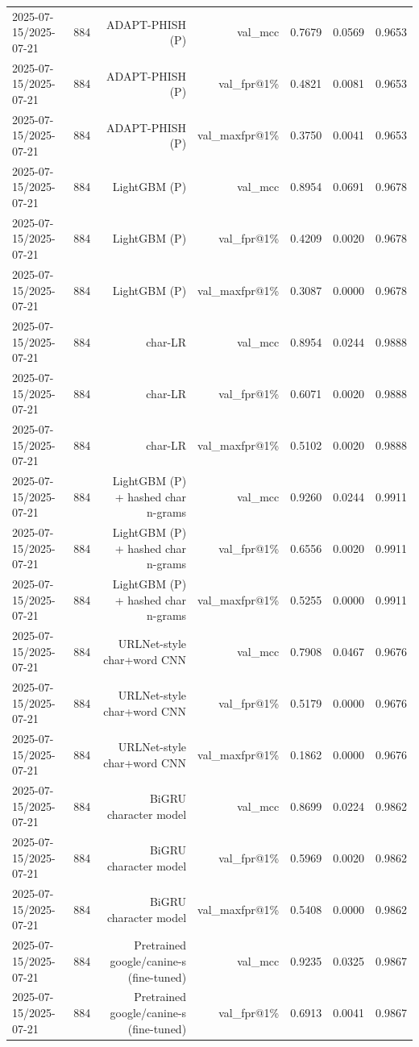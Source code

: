 \begin{table}[t]
\begin{tabular}{llrrrrr}
2025-07-15/2025-07-21 & 884 & ADAPT-PHISH (P) & val\_mcc & 0.7679 & 0.0569 & 0.9653 \\
2025-07-15/2025-07-21 & 884 & ADAPT-PHISH (P) & val\_fpr@1\% & 0.4821 & 0.0081 & 0.9653 \\
2025-07-15/2025-07-21 & 884 & ADAPT-PHISH (P) & val\_maxfpr@1\% & 0.3750 & 0.0041 & 0.9653 \\
2025-07-15/2025-07-21 & 884 & LightGBM (P) & val\_mcc & 0.8954 & 0.0691 & 0.9678 \\
2025-07-15/2025-07-21 & 884 & LightGBM (P) & val\_fpr@1\% & 0.4209 & 0.0020 & 0.9678 \\
2025-07-15/2025-07-21 & 884 & LightGBM (P) & val\_maxfpr@1\% & 0.3087 & 0.0000 & 0.9678 \\
2025-07-15/2025-07-21 & 884 & char-LR & val\_mcc & 0.8954 & 0.0244 & 0.9888 \\
2025-07-15/2025-07-21 & 884 & char-LR & val\_fpr@1\% & 0.6071 & 0.0020 & 0.9888 \\
2025-07-15/2025-07-21 & 884 & char-LR & val\_maxfpr@1\% & 0.5102 & 0.0020 & 0.9888 \\
2025-07-15/2025-07-21 & 884 & LightGBM (P) + hashed char n-grams & val\_mcc & 0.9260 & 0.0244 & 0.9911 \\
2025-07-15/2025-07-21 & 884 & LightGBM (P) + hashed char n-grams & val\_fpr@1\% & 0.6556 & 0.0020 & 0.9911 \\
2025-07-15/2025-07-21 & 884 & LightGBM (P) + hashed char n-grams & val\_maxfpr@1\% & 0.5255 & 0.0000 & 0.9911 \\
2025-07-15/2025-07-21 & 884 & URLNet-style char+word CNN & val\_mcc & 0.7908 & 0.0467 & 0.9676 \\
2025-07-15/2025-07-21 & 884 & URLNet-style char+word CNN & val\_fpr@1\% & 0.5179 & 0.0000 & 0.9676 \\
2025-07-15/2025-07-21 & 884 & URLNet-style char+word CNN & val\_maxfpr@1\% & 0.1862 & 0.0000 & 0.9676 \\
2025-07-15/2025-07-21 & 884 & BiGRU character model & val\_mcc & 0.8699 & 0.0224 & 0.9862 \\
2025-07-15/2025-07-21 & 884 & BiGRU character model & val\_fpr@1\% & 0.5969 & 0.0020 & 0.9862 \\
2025-07-15/2025-07-21 & 884 & BiGRU character model & val\_maxfpr@1\% & 0.5408 & 0.0000 & 0.9862 \\
2025-07-15/2025-07-21 & 884 & Pretrained google/canine-s (fine-tuned) & val\_mcc & 0.9235 & 0.0325 & 0.9867 \\
2025-07-15/2025-07-21 & 884 & Pretrained google/canine-s (fine-tuned) & val\_fpr@1\% & 0.6913 & 0.0041 & 0.9867 \\

\end{tabular}
\end{table}
